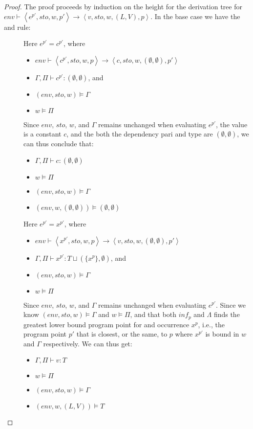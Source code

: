 \documentclass[../../master.tex]{subfiles}
\begin{document}
\begin{proof}
	The proof proceeds by induction on the height for the derivation tree for $env\vdash\left\langle e^{p'},sto,w,p'\right\rangle\rightarrow\left\langle v,sto,w,(L,V),p\right\rangle$.
	In the base case we have the  and  rule:
	\begin{description}
		\item[] Here $e^{p'}=c^{p'}$, where
			\begin{itemize}
				\item $env\vdash\left\langle c^{p'},sto,w,p\right\rangle\rightarrow\left\langle c,sto,w,(\emptyset,\emptyset),p'\right\rangle$
				\item $\Gamma,\Pi\vdash c^{p'}:(\emptyset,\emptyset)$, and 
				\item $(env,sto,w)\models\Gamma$
				\item $w\models\Pi$
			\end{itemize}
			Since $env$, $sto$, $w$, and $\Gamma$ remains unchanged when evaluating $e^{p'}$, the value is a constant $c$, and the both the dependency pari and type are $(\emptyset,\emptyset)$, we can thus conclude that:
			\begin{itemize}
				\item $\Gamma,\Pi\vdash c : (\emptyset,\emptyset)$
				\item $w\models\Pi$
				\item $(env,sto,w)\models\Gamma$
				\item $(env,w,(\emptyset,\emptyset))\models(\emptyset,\emptyset)$
			\end{itemize}

		\item[] Here $e^{p'}=x^{p'}$, where
			\begin{itemize}
				\item $env\vdash\left\langle x^{p'},sto,w,p\right\rangle\rightarrow\left\langle v,sto,w,(\emptyset,\emptyset),p'\right\rangle$
				\item $\Gamma,\Pi\vdash x^{p'}:T\sqcup (\{x^p\},\emptyset)$, and 
				\item $(env,sto,w)\models\Gamma$
				\item $w\models\Pi$
			\end{itemize}
			Since $env$, $sto$, $w$, and $\Gamma$ remains unchanged when evaluating $e^{p'}$.
			Since we know $(env,sto,w)\models\Gamma$ and $w\models\Pi$, and that both $inf_p$ and $\Lambda$ finds the greatest lower bound program point for and occurrence $x^p$, i.e., the program point $p'$ that is closest, or the same, to $p$ where $x^{p'}$ is bound in $w$ and $\Gamma$ respectively.
			We can thus get:
			\begin{itemize}
				\item $\Gamma,\Pi\vdash v:T$
				\item $w\models\Pi$
				\item $(env,sto,w)\models\Gamma$
				\item $(env,w,(L,V))\models T$
			\end{itemize}
	\end{description}


\end{proof}
\end{document}
